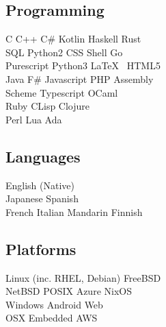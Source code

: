 \documentclass[a4paper]{cv}
\begin{document}
\begin{minipage}[t]{0.33\textwidth}
\subsection{Programming}

C \textbullet{} C++ \textbullet{} C\# \textbullet{} Kotlin \textbullet{} Haskell \textbullet{} Rust \\
SQL \textbullet{} Python2 \textbullet{} CSS \textbullet{} Shell \textbullet{} Go \\
Purescript \textbullet{} Python3 \textbullet{} \LaTeX\ \textbullet{} {\small HTML5} \\\vspace{4pt}
Java \textbullet{} F\# \textbullet{} Javascript \textbullet{} PHP \textbullet{} Assembly \\
Scheme \textbullet{} Typescript \textbullet{} OCaml \\\vspace{4pt}
Ruby \textbullet{} CLisp \textbullet{} Clojure \\
Perl \textbullet{} Lua \textbullet{} Ada

\sectionspace %

\subsection{Languages}
English (Native) \\\vspace{4pt}
Japanese \textbullet{} Spanish \\\vspace{4pt}
French \textbullet{} Italian \textbullet{} Mandarin \textbullet{} Finnish

\sectionspace %

\subsection{Platforms}
Linux (inc. RHEL, Debian) \textbullet{} FreeBSD \\
NetBSD \textbullet{} POSIX \textbullet{} Azure \textbullet{} NixOS \\\vspace{4pt}
Windows \textbullet{} Android \textbullet{} Web \\\vspace{4pt}
OSX \textbullet{} Embedded \textbullet{} AWS


\end{minipage} %
\end{document}
